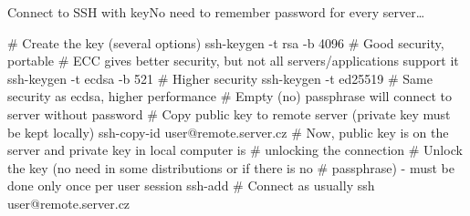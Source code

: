\documentclass[compress, ucs, xelatex, 11pt, xcolor=svgnames, aspectratio=169,
	hyperref={
		bookmarks=true,
		unicode=true,
		colorlinks=true,
		pdftitle={Linux, command line and MetaCentrum},
		plainpages=false,
		pdfauthor={Vojtech Zeisek},
		pdfsubject={Course about use of Linux command line, writing shell scripts and using MetaCentrum of CESNET},
		pdfcreator={XeLaTeX},
		pdfkeywords={Linux, GNU, BASH, shell, command line, MetaCentrum},
		linkcolor=DarkRed, %
		anchorcolor=DarkBlue, %
		citecolor=Indigo, %
		filecolor=NavyBlue, %
		menucolor=DarkMagenta, %
		urlcolor=DarkBlue, %
		pdftex},
	url={hyphens, lowtilde} %
	]{beamer}
\begin{document}
\begin{frame}[fragile]{Connect to SSH with key}{No need to remember password for every server\ldots}
	\begin{bashcode}
    # Create the key (several options)
    ssh-keygen -t rsa -b 4096 # Good security, portable
    # ECC gives better security, but not all servers/applications support it
    ssh-keygen -t ecdsa -b 521 # Higher security
    ssh-keygen -t ed25519 # Same security as ecdsa, higher performance
    # Empty (no) passphrase will connect to server without password
    # Copy public key to remote server (private key must be kept locally)
    ssh-copy-id user@remote.server.cz
    # Now, public key is on the server and private key in local computer is
    # unlocking the connection
    # Unlock the key (no need in some distributions or if there is no
    # passphrase) - must be done only once per user session
    ssh-add
    # Connect as usually
    ssh user@remote.server.cz
	\end{bashcode}
\end{frame}
\end{document}
